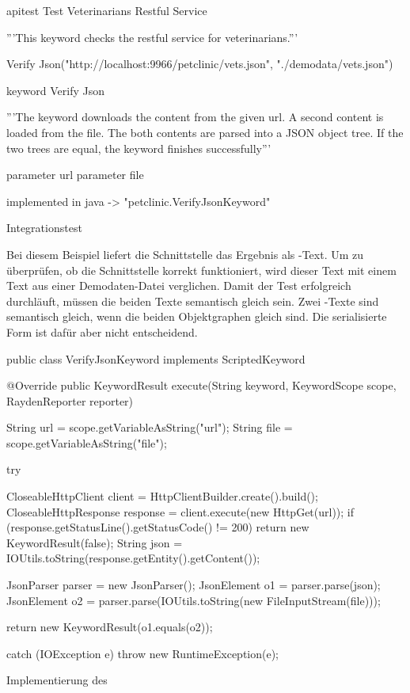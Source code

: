 \begin{program}
\begin{JavaCode}
apitest Test Veterinarians Restful Service {
	'''This keyword checks the restful service for veterinarians.'''
	
	Verify Json("http://localhost:9966/petclinic/vets.json", 
	            "./demodata/vets.json")
}

keyword Verify Json {
  '''The keyword downloads the content from the given url. A second 
	   content is loaded from the file. The both contents are parsed
		 into a JSON object tree. If the two trees are equal, the 
		 keyword finishes successfully'''
		
	parameter url
	parameter file

	implemented in java -> "petclinic.VerifyJsonKeyword"
}
\end{JavaCode}
\caption{Integrationstest }
\label{prog:integrationTest}
\end{program}

\SuperPar 
Bei diesem Beispiel liefert die Schnittstelle das Ergebnis als -Text. Um zu überprüfen, ob die Schnittstelle korrekt funktioniert, wird dieser Text mit einem Text aus einer Demodaten-Datei verglichen. Damit der Test erfolgreich durchläuft, müssen die beiden Texte semantisch gleich sein. Zwei -Texte sind semantisch gleich, wenn die beiden Objektgraphen gleich sind. Die serialisierte Form ist dafür aber nicht entscheidend.

\begin{program}
\begin{JavaCode}
public class VerifyJsonKeyword implements ScriptedKeyword {
  @Override
  public KeywordResult execute(String keyword, KeywordScope scope, RaydenReporter reporter) {
    String url = scope.getVariableAsString("url");
    String file = scope.getVariableAsString("file");

    try {
      CloseableHttpClient client = HttpClientBuilder.create().build();
      CloseableHttpResponse response = client.execute(new HttpGet(url));
      if (response.getStatusLine().getStatusCode() != 200) {
        return new KeywordResult(false);
      }
      String json = IOUtils.toString(response.getEntity().getContent());

      JsonParser parser = new JsonParser();
      JsonElement o1 = parser.parse(json);
      JsonElement o2 = parser.parse(IOUtils.toString(new FileInputStream(file)));

      return new KeywordResult(o1.equals(o2));
    } catch (IOException e) {
      throw new RuntimeException(e);
    }
  }
}
\end{JavaCode}
\caption{Implementierung des }
\label{prog:integrationTestImpl}
\end{program}

